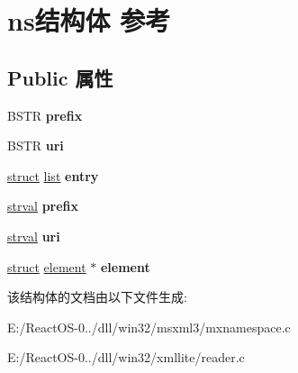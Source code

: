 \hypertarget{structns}{}\section{ns结构体 参考}
\label{structns}
\subsection*{Public 属性}
\begin{DoxyCompactItemize}
\item 
\mbox{\label{structns_ac67fc80ed3b4a10e8277653fbede7a5c}} 
B\+S\+TR {\bfseries prefix}
\item 
\mbox{\label{structns_aca39a87bf031aefdab39ddb271461c85}} 
B\+S\+TR {\bfseries uri}
\item 
\mbox{\label{structns_aa7244c5e3520d44ccfc70fbff6bd8cc4}} 
\hyperlink{interfacestruct}{struct} \hyperlink{classlist}{list} {\bfseries entry}
\item 
\mbox{\label{structns_a8181b30804846658e8c891c8a739d213}} 
\hyperlink{structstrval}{strval} {\bfseries prefix}
\item 
\mbox{\label{structns_aa94e377bf872f8ff435ff4cc02f8830f}} 
\hyperlink{structstrval}{strval} {\bfseries uri}
\item 
\mbox{\label{structns_ac70e34eb17a2553e4b282aa97767df15}} 
\hyperlink{interfacestruct}{struct} \hyperlink{structelement}{element} $\ast$ {\bfseries element}
\end{DoxyCompactItemize}


该结构体的文档由以下文件生成\+:\begin{DoxyCompactItemize}
\item 
E\+:/\+React\+O\+S-\/0../dll/win32/msxml3/mxnamespace.\+c\item 
E\+:/\+React\+O\+S-\/0../dll/win32/xmllite/reader.\+c\end{DoxyCompactItemize}
